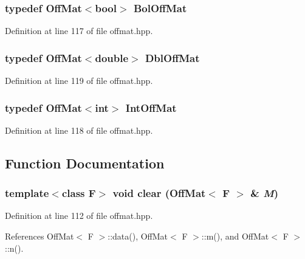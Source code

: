 \subsubsection{\setlength{\rightskip}{0pt plus 5cm}typedef {\bf Off\-Mat}$<$bool$>$ {\bf Bol\-Off\-Mat}}\label{offmat_8hpp_ec4e02e81c0727639006f9ea0ff976e2_ec4e02e81c0727639006f9ea0ff976e2}




Definition at line 117 of file offmat.hpp.
\subsubsection{\setlength{\rightskip}{0pt plus 5cm}typedef {\bf Off\-Mat}$<$double$>$ {\bf Dbl\-Off\-Mat}}\label{offmat_8hpp_b5935eabe823c3b66b37e1953318fb9f_b5935eabe823c3b66b37e1953318fb9f}




Definition at line 119 of file offmat.hpp.
\subsubsection{\setlength{\rightskip}{0pt plus 5cm}typedef {\bf Off\-Mat}$<$int$>$ {\bf Int\-Off\-Mat}}\label{offmat_8hpp_aa88215ec13fc0c85443df1b69d33b09_aa88215ec13fc0c85443df1b69d33b09}




Definition at line 118 of file offmat.hpp.

\subsection{Function Documentation}
\subsubsection{\setlength{\rightskip}{0pt plus 5cm}template$<$class F$>$ void clear ({\bf Off\-Mat}$<$ F $>$ \& {\em M})\hspace{0.3cm}{\tt  [inline]}}\label{offmat_8hpp_11eafc5ae62bba5bb1ea01a32a3fa85a_11eafc5ae62bba5bb1ea01a32a3fa85a}




Definition at line 112 of file offmat.hpp.

References Off\-Mat$<$ F $>$::data(), Off\-Mat$<$ F $>$::m(), and Off\-Mat$<$ F $>$::n().

